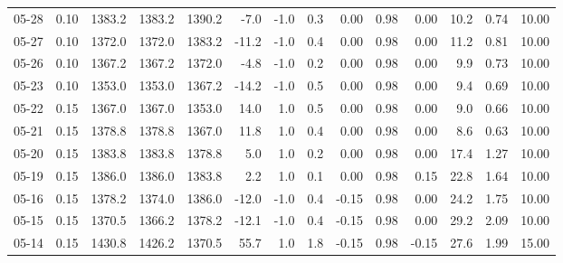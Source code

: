 \begin{threeparttable}
{\begin{tabular}{lrrrrrrrrrrrrr}
  05-28 &     0.10 & 1383.2 & 1383.2 & 1390.2 &       -7.0 &                     -1.0 &                 0.3 &       0.00 &      0.98 &           0.00 &             10.2 &            0.74 &                  10.00 \\
  05-27 &     0.10 & 1372.0 & 1372.0 & 1383.2 &      -11.2 &                     -1.0 &                 0.4 &       0.00 &      0.98 &           0.00 &             11.2 &            0.81 &                  10.00 \\
  05-26 &     0.10 & 1367.2 & 1367.2 & 1372.0 &       -4.8 &                     -1.0 &                 0.2 &       0.00 &      0.98 &           0.00 &              9.9 &            0.73 &                  10.00 \\
  05-23 &     0.10 & 1353.0 & 1353.0 & 1367.2 &      -14.2 &                     -1.0 &                 0.5 &       0.00 &      0.98 &           0.00 &              9.4 &            0.69 &                  10.00 \\
  05-22 &     0.15 & 1367.0 & 1367.0 & 1353.0 &       14.0 &                      1.0 &                 0.5 &       0.00 &      0.98 &           0.00 &              9.0 &            0.66 &                  10.00 \\
  05-21 &     0.15 & 1378.8 & 1378.8 & 1367.0 &       11.8 &                      1.0 &                 0.4 &       0.00 &      0.98 &           0.00 &              8.6 &            0.63 &                  10.00 \\
  05-20 &     0.15 & 1383.8 & 1383.8 & 1378.8 &        5.0 &                      1.0 &                 0.2 &       0.00 &      0.98 &           0.00 &             17.4 &            1.27 &                  10.00 \\
  05-19 &     0.15 & 1386.0 & 1386.0 & 1383.8 &        2.2 &                      1.0 &                 0.1 &       0.00 &      0.98 &           0.15 &             22.8 &            1.64 &                  10.00 \\
  05-16 &     0.15 & 1378.2 & 1374.0 & 1386.0 &      -12.0 &                     -1.0 &                 0.4 &      -0.15 &      0.98 &           0.00 &             24.2 &            1.75 &                  10.00 \\
  05-15 &     0.15 & 1370.5 & 1366.2 & 1378.2 &      -12.1 &                     -1.0 &                 0.4 &      -0.15 &      0.98 &           0.00 &             29.2 &            2.09 &                  10.00 \\
  05-14 &     0.15 & 1430.8 & 1426.2 & 1370.5 &       55.7 &                      1.0 &                 1.8 &      -0.15 &      0.98 &          -0.15 &             27.6 &            1.99 &                  15.00 \\

\end{tabular}}
\end{threeparttable}
